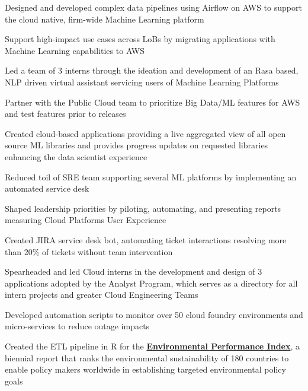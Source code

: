 \documentclass[]{deedy-resume-openfont}
\begin{document}
\begin{tightemize}
\item Designed and developed complex data pipelines using Airflow on AWS to support the cloud native, firm-wide Machine Learning platform
\item Support high-impact use cases across LoBs by migrating applications with Machine Learning capabilities to AWS
\item Led a team of 3 interns through the ideation and development of an Rasa based, NLP driven virtual assistant servicing users of Machine Learning Platforms
\item Partner with the Public Cloud team to prioritize Big Data/ML features for AWS and test features prior to releases
\item Created cloud-based applications providing a live aggregated view of all open source ML libraries and provides progress updates on requested libraries enhancing the data scientist experience
\item Reduced toil of SRE team supporting several ML platforms by implementing an automated service desk
\end{tightemize}
\begin{tightemize}
\item Shaped leadership priorities by piloting, automating, and presenting reports measuring Cloud Platforms User Experience
\item Created JIRA service desk bot, automating ticket interactions resolving more than 20\% of tickets without team intervention
\item Spearheaded and led Cloud interns in the development and design of 3 applications adopted by the Analyst Program, which serves as a directory for all intern projects and greater Cloud Engineering Teams
\item Developed automation scripts to monitor over 50 cloud foundry environments and micro-services to reduce outage impacts
\end{tightemize}
\sectionsep

\begin{tightemize}
\item Created the ETL pipeline in R for the \textbf{\href{https://epi.envirocenter.yale.edu/epi-team}{Environmental Performance Index}}, a biennial report that ranks the environmental sustainability of 180 countries to enable policy makers worldwide in establishing targeted environmental policy goals
\end{tightemize}
\sectionsep
\end{document}
